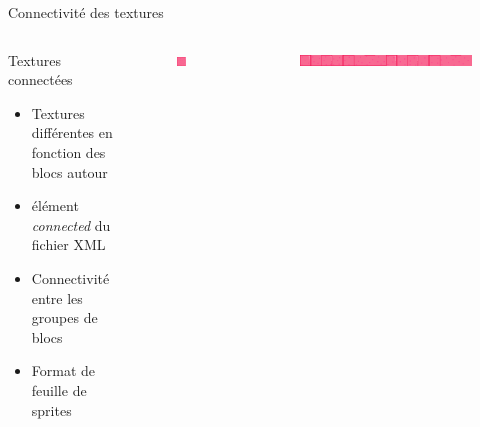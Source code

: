 \documentclass{beamer}
\begin{document}
{\begin{frame}{Connectivité des textures}
    \begin{columns}
            \begin{block}{Textures connectées}
                \begin{itemize}
                    \item[\bullet] Textures différentes en fonction des blocs autour
                    \item[\bullet] élément \emph{connected} du fichier XML
                    \item[\bullet] Connectivité entre les groupes de blocs
                    \item[\bullet] Format de feuille de sprites
                \end{itemize}
            \end{block}
            \begin{figure}
                \centering
                \includegraphics[width=0.4\textwidth]{images/connectedTiles.png}
            \end{figure}
            \begin{figure}
                \centering
                \includegraphics[width=1.0\textwidth]{images/tile_jelly.png}
            \end{figure}
    \end{columns}
\end{frame}

}
\end{document}
